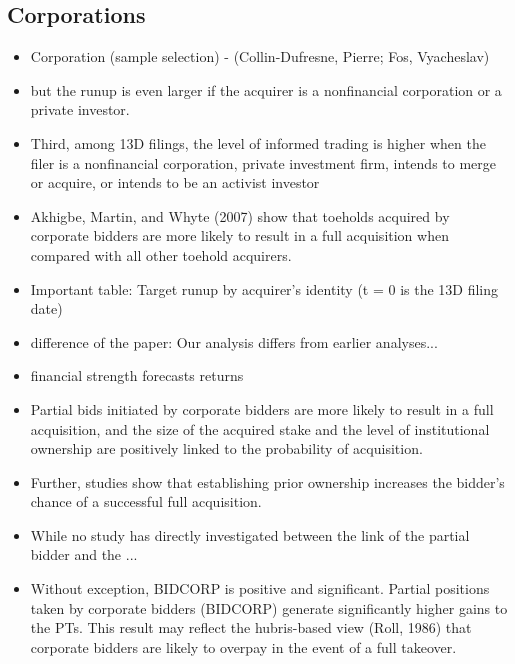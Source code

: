 \documentclass[12pt]{article}
\begin{document}
\subsection{Corporations}

    \begin{itemize}

        \item Corporation (sample selection) - (Collin-Dufresne, Pierre; Fos, Vyacheslav)

        \item but the runup is even larger if the acquirer is a nonfinancial corporation or a private investor.\citep{Brigida2012}

        \item Third, among 13D filings, the level of informed trading is higher when the filer is a nonfinancial corporation, private investment firm, intends to merge or acquire, or intends to be an activist investor \citep{Brigida2012}

        \item Akhigbe, Martin, and Whyte (2007) show that toeholds acquired by corporate bidders are more likely to result in a full acquisition when compared with all other toehold acquirers.\citep{Brigida2012}

        \item Important table: Target runup by acquirer's identity (t = 0 is the 13D filing date) \citep{Brigida2012}

        \item difference of the paper: Our analysis differs from earlier analyses...\citep{Brigida2012}

        \item financial strength forecasts returns \citep{Choi2012}

        \item Partial bids initiated by corporate bidders are more likely to result in a full acquisition, and the size of the acquired stake and the level of institutional ownership are positively linked to the probability of acquisition. \citep{Akhigbe2007}

        \item Further, studies show that establishing prior ownership increases the bidder’s chance of a successful full acquisition. \citep{Akhigbe2007}

        \item While no study has directly investigated between the link of the partial bidder and the ... \citep{Akhigbe2007}

        \item Without exception, BIDCORP is positive and significant. Partial positions taken by corporate bidders (BIDCORP) generate significantly higher gains to the PTs. This result may reflect the hubris-based view (Roll, 1986) that corporate bidders are likely to overpay in the event of a full takeover. \citep{Akhigbe2007}

    \end{itemize}
\end{document}

